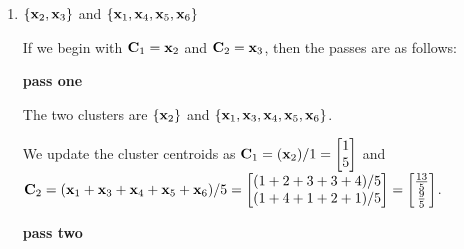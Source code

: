 \begin{solution}
\begin{enumerate}
  and $\vect{C}_2 = (\vect{x}_2 + \vect{x}_3 ) / 2 = \begin{bmatrix}(1 + 2)/2\\(5 + 4)/2\end{bmatrix} = \begin{bmatrix}\frac{3}{2}\\\frac{9}{2}\end{bmatrix}$.
 
  
  \textbf{pass three}
    
   The two clusters are still $\{\vect{x}_1, \vect{x}_4, \vect{x}_5, \vect{x}_6\}$ and $\{\vect{x}_2, \vect{x}_3\}$, and the algorithm halts because no data points moved clusters.
    
  
  \item
  
    \begin{answer}
  $\{\vect{x}_2, \vect{x}_3 \}$ and $\{\vect{x}_1, \vect{x}_4, \vect{x}_5, \vect{x}_6\}$
  \end{answer}
  
  If we begin with $\mathbf{C}_1 = \mathbf{x}_2$ and $\mathbf{C}_2 = \mathbf{x}_3$, then the passes are as follows:
  
  \textbf{pass one}
  
 The two clusters are $ \{\mathbf{x}_2\}$ and  $\{\mathbf{x}_1, \mathbf{x}_3, \mathbf{x}_4, \mathbf{x}_5, \mathbf{x}_6\}$.
 
 We update the cluster centroids as $\mathbf{C}_1 = (\mathbf{x}_2 )/1
  = \begin{bmatrix}1 \\ 5\end{bmatrix}$ and $\mathbf{C}_2 = (\mathbf{x}_1 + \mathbf{x}_3 + \mathbf{x}_4 + \mathbf{x}_5 + \mathbf{x}_6)/5
  = \begin{bmatrix}(1 + 2 + 3 + 3 + 4) / 5 \\ (1 + 4 + 1 + 2+ 1)/5\end{bmatrix} = \begin{bmatrix}\frac{13}{5} \\ \frac{9}{5}\end{bmatrix}$.
  
  \textbf{pass two}
  

\end{enumerate}
\end{solution}
